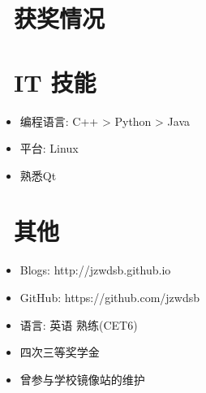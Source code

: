 \documentclass{resume}
\begin{document}
\begin{comment}
\datedsubsection{\textbf{\LaTeX\ résumé template}}{May. 2015 -- Present}
\role{\LaTeX, Maintainer}{Individual Projects}
An elegant \LaTeX\ résumé template, https://github.com/billryan/resume
\begin{itemize}
  \item Easy to be further customized or extended	
  \item Full support for unicode characters (e.g. CJK) with \XeLaTeX\
  \item FontAwesome 4.5.0 support
\end{itemize}
\end{comment}


\section{\faHeartO\ 获奖情况}


\section{\faCogs\ IT 技能}
\begin{itemize}[parsep=0.5ex]
  \item 编程语言: C++ > Python > Java
  \item 平台: Linux
  \item 熟悉Qt
\end{itemize}

\section{\faInfo\ 其他}
\begin{itemize}[parsep=0.5ex]
  \item Blogs: http://jzwdsb.github.io
  \item GitHub: https://github.com/jzwdsb
  \item 语言: 英语 熟练(CET6)
  \item 四次三等奖学金
  \item 曾参与学校镜像站的维护
\end{itemize}

%
%
\end{document}
